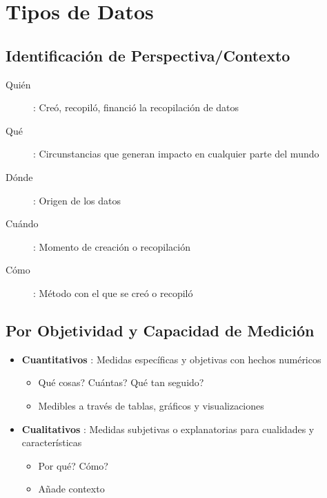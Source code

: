 \section{Tipos de Datos}

\subsection{Identificación de Perspectiva/Contexto}
\begin{description}
    \item[Quién]{ : Creó, recopiló, financió la recopilación de datos}
    \item[Qué]{ : Circunstancias que generan impacto en cualquier parte del mundo}
    \item[Dónde]{ : Origen de los datos}
    \item[Cuándo]{ : Momento de creación o recopilación} 
    \item[Cómo]{ : Método con el que se creó o recopiló} 
\end{description}

\subsection{Por Objetividad y Capacidad de Medición}
\begin{itemize}
    \item {\textbf{Cuantitativos} : Medidas específicas y objetivas con hechos numéricos
    \begin{itemize}
        \item {Qué cosas? Cuántas? Qué tan seguido?}
        \item {Medibles a través de tablas, gráficos y visualizaciones}
    \end{itemize}}
    \item {\textbf{Cualitativos} : Medidas subjetivas o explanatorias para cualidades y características
    \begin{itemize}
        \item {Por qué? Cómo?}
        \item {Añade contexto}
    \end{itemize}}
\end{itemize}

